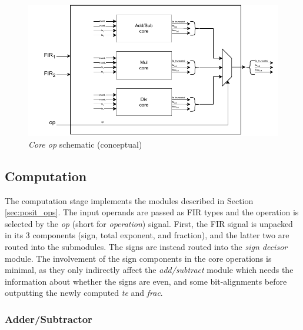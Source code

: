 \begin{figure}
    \centering
        \centering
        \includegraphics[width=\textwidth]{figures/core_op.drawio.pdf}
        \caption{\textit{Core op} schematic (conceptual)}
        \label{fig:core_op_ppu_schematic}
\end{figure}   






\subsection{Computation}


The computation stage implements the modules described in Section \ref{sec:posit_ops}.
The input operands are passed as FIR types and the operation is selected by the \textit{op} (short for \textit{operation}) signal.
First, the FIR signal is unpacked in its 3 components (sign, total exponent, and fraction), and the latter two are routed into the submodules. The signs are instead routed into the \textit{sign decisor} module. The involvement of the sign components in the core operations is minimal, as they only indirectly affect the \textit{add/subtract} module which needs the information about whether the signs are even, and some bit-alignments before outputting the newly computed \textit{te} and \textit{frac}.




\subsubsection{Adder/Subtractor}

